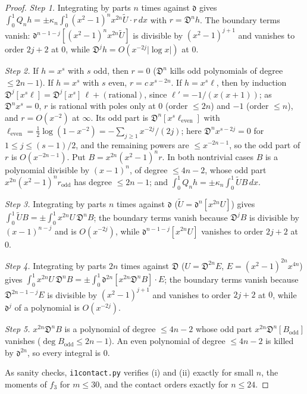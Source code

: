 \documentclass[11pt]{amsart}
\theoremstyle{definition}
\theoremstyle{remark}
\numberwithin{equation}{section}
\newcommand{\file}[1]{{\def\_{\textunderscore\allowbreak}\texttt{#1}}}
\begin{document}
\begin{proof}
\emph{Step 1.} Integrating by parts $n$ times against $\mathfrak d$ gives
$\int_0^1Q_nh=\pm\kappa_n\int_0^1(x^2-1)^nx^{2n}\tilde U\cdot r\,dx$ with $r=\mathfrak D^nh$. The boundary terms vanish:
$\mathfrak d^{n-1-j}[(x^2-1)^nx^{2n}\tilde U]$ is divisible by $(x^2-1)^{j+1}$ and vanishes to order $2j+2$ at $0$, while
$\mathfrak D^jh=O(x^{-2j}|\log x|)$ at $0$.

\emph{Step 2.} If $h=x^s$ with $s$ odd, then $r=0$ ($\mathfrak D^n$ kills odd polynomials of degree $\le2n-1$). If $h=x^s$
with $s$ even, $r=c\,x^{s-2n}$. If $h=x^s\ell$, then by induction $\mathfrak D^j[x^s\ell]=\mathfrak D^j[x^s]\,\ell+
(\text{rational})$, since $\ell'=-1/(x(x+1))$; as $\mathfrak D^nx^s=0$, $r$ is rational with poles only at $0$ (order
$\le2n$) and $-1$ (order $\le n$), and $r=O(x^{-2})$ at $\infty$. Its odd part is $\mathfrak D^n[x^s\ell_{\mathrm{even}}]$
with $\ell_{\mathrm{even}}=\frac12\log(1-x^{-2})=-\sum_{j\ge1}x^{-2j}/(2j)$; here $\mathfrak D^nx^{s-2j}=0$ for
$1\le j\le(s-1)/2$, and the remaining powers are $\le x^{-2n-1}$, so the odd part of $r$ is $O(x^{-2n-1})$. Put
$B=x^{2n}(x^2-1)^nr$. In both nontrivial cases $B$ is a polynomial divisible by $(x-1)^n$, of degree $\le4n-2$, whose odd
part $x^{2n}(x^2-1)^nr_{\mathrm{odd}}$ has degree $\le2n-1$; and $\int_0^1Q_nh=\pm\kappa_n\int_0^1\tilde U B\,dx$.

\emph{Step 3.} Integrating by parts $n$ times against $\mathfrak d$ ($\tilde U=\mathfrak d^n[x^{2n}U]$) gives
$\int_0^1\tilde UB=\pm\int_0^1x^{2n}U\,\mathfrak D^nB$; the boundary terms vanish because $\mathfrak D^jB$ is divisible by
$(x-1)^{n-j}$ and is $O(x^{-2j})$, while $\mathfrak d^{n-1-j}[x^{2n}U]$ vanishes to order $2j+2$ at $0$.

\emph{Step 4.} Integrating by parts $2n$ times against $\mathfrak D$ ($U=\mathfrak D^{2n}E$, $E=(x^2-1)^{2n}x^{4n}$) gives
$\int_0^1x^{2n}U\,\mathfrak D^nB=\pm\int_0^1\mathfrak d^{2n}[x^{2n}\mathfrak D^nB]\cdot E$; the boundary terms vanish because
$\mathfrak D^{2n-1-j}E$ is divisible by $(x^2-1)^{j+1}$ and vanishes to order $2j+2$ at $0$, while $\mathfrak d^j$ of a
polynomial is $O(x^{-2j})$.

\emph{Step 5.} $x^{2n}\mathfrak D^nB$ is a polynomial of degree $\le4n-2$ whose odd part $x^{2n}\mathfrak D^n[B_{\mathrm
{odd}}]$ vanishes ($\deg B_{\mathrm{odd}}\le2n-1$). An even polynomial of degree $\le4n-2$ is killed by $\mathfrak d^{2n}$,
so every integral is $0$.

As sanity checks, \file{i1\_contact.py} verifies (i) and (ii) exactly for small $n$, the moments of $f_3$ for $m\le30$, and
the contact orders exactly for $n\le24$.
\end{proof}
\end{document}

